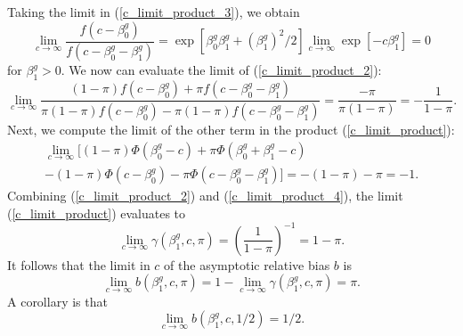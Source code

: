 \documentclass[12pt]{article}
\begin{document}
\begin{appendices}
Taking the limit in (\ref{c_limit_product_3}), we obtain
$$
\lim_{c \to \infty} \frac{f(c - \beta^g_0)}{f(c - \beta^g_0 - \beta^g_1)} = \exp[ \beta^g_0 \beta^g_1 + (\beta^g_1)^2/2] \lim_{c \to \infty} \exp[ -c \beta^g_1] = 0
$$ for $\beta^g_1 > 0$. We now can evaluate the limit of (\ref{c_limit_product_2}):
$$ \lim_{c \to \infty} \frac{(1-\pi) f(c - \beta^g_0) + \pi f(c - \beta^g_0 - \beta^g_1)}{\pi (1-\pi) f(c - \beta^g_0) - \pi (1-\pi)f(c - \beta^g_0 - \beta^g_1)} = \frac{-\pi}{\pi(1-\pi)} = -\frac{1}{1 -\pi}.$$ Next, we compute the limit of the other term in the product (\ref{c_limit_product}):
\begin{multline}\label{c_limit_product_4}
\lim_{c \to \infty} \bigg[ (1-\pi)\Phi(\beta_0^g - c) + \pi \Phi(\beta^g_0 + \beta^g_1 - c) \\ - (1-\pi)\Phi(c - \beta^g_0) - \pi \Phi(c - \beta_0^g - \beta_1^g) \bigg] = -(1-\pi) - \pi = -1.
\end{multline}
Combining (\ref{c_limit_product_2}) and (\ref{c_limit_product_4}), the limit (\ref{c_limit_product}) evaluates to
$$ \lim_{c \to \infty} \gamma(\beta^g_1, c, \pi) = \left(  \frac{ 1 }{ 1 - \pi }\right)^{-1} = 1 - \pi.$$ It follows that the limit in $c$ of the asymptotic relative bias $b$ is
$$\lim_{c \to \infty} b(\beta^g_1, c, \pi) = 1 - \lim_{c \to \infty} \gamma(\beta^g_1, c, \pi) = \pi.$$
A corollary is that
$$\lim_{c \to \infty} b(\beta^g_1, c, 1/2) = 1/2.$$


\end{appendices}
\end{document}
